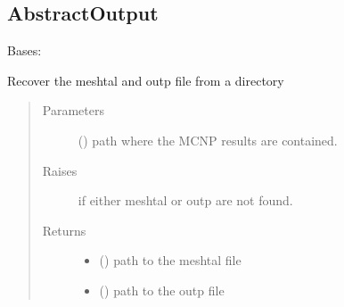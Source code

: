 \documentclass[letterpaper,10pt,english]{sphinxmanual}
\begin{document}
\subsection{AbstractOutput}
\label{\detokenize{api/postprocessing:abstractoutput}}\label{\detokenize{api/postprocessing:abstractoutputob}}

\begin{fulllineitems}
\label{\detokenize{api/postprocessing:output.AbstractOutput}}
Bases: 

\begin{fulllineitems}
\label{\detokenize{api/postprocessing:output.AbstractOutput._get_output_files}}
Recover the meshtal and outp file from a directory
\begin{quote}\begin{description}
\item[{Parameters}] \leavevmode
{} () \textendash{} path where the MCNP results are contained.

\item[{Raises}] \leavevmode
{} \textendash{} if either meshtal or outp are not found.

\item[{Returns}] \leavevmode
\begin{itemize}
\item {} 
 () \textendash{} path to the meshtal file

\item {} 
 () \textendash{} path to the outp file

\end{itemize}


\end{description}\end{quote}


\end{fulllineitems}
\end{fulllineitems}
\end{document}
